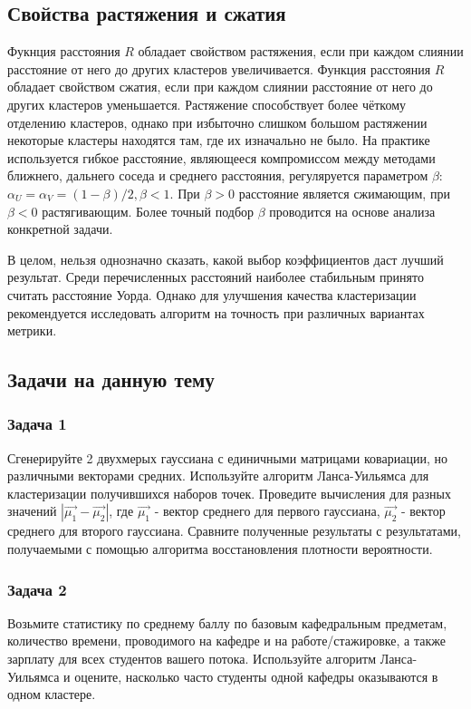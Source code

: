 \subsection{Свойства растяжения и сжатия}

Фукнция расстояния $R$ обладает свойством растяжения, если при каждом слиянии расстояние от него до других кластеров увеличивается. Функция расстояния $R$ обладает свойством сжатия, если при каждом слиянии расстояние от него до других кластеров уменьшается. Растяжение способствует более чёткому отделению кластеров, однако при избыточно слишком большом растяжении некоторые кластеры находятся там, где их изначально не было. На практике используется гибкое расстояние, являющееся компромиссом между методами ближнего, дальнего соседа и среднего расстояния, регуляруется параметром $\beta$: $\alpha_U = \alpha_V = (1 - \beta)/2, \beta < 1$. При $\beta > 0$ расстояние является сжимающим, при $\beta < 0$ растягивающим. Более точный подбор $\beta$ проводится на основе анализа конкретной задачи. 

В целом, нельзя однозначно сказать, какой выбор коэффициентов даст лучший результат. Среди перечисленных расстояний наиболее стабильным принято считать расстояние Уорда. Однако для улучшения качества кластеризации рекомендуется исследовать алгоритм на точность при различных вариантах метрики. 

\subsection*{Задачи на данную тему}

\subsubsection*{Задача 1}
Сгенерируйте 2 двухмерых гауссиана с единичными матрицами ковариации, но различными векторами средних. Используйте алгоритм Ланса-Уильямса для кластеризации получившихся наборов точек. Проведите вычисления для разных значений $|\Vec{\mu_1} - \Vec{\mu_2}|$, где $\Vec{\mu_1}$ - вектор среднего для первого гауссиана, $\Vec{\mu_2}$ - вектор среднего для второго гауссиана. Сравните полученные результаты с результатами, получаемыми с помощью алгоритма восстановления плотности вероятности. 

\subsubsection*{Задача 2}
Возьмите статистику по среднему баллу по базовым кафедральным предметам, количество времени, проводимого на кафедре и на работе/стажировке, а также зарплату для всех студентов вашего потока. Используйте алгоритм Ланса-Уильямса и оцените, насколько часто студенты одной кафедры оказываются в одном кластере. 

